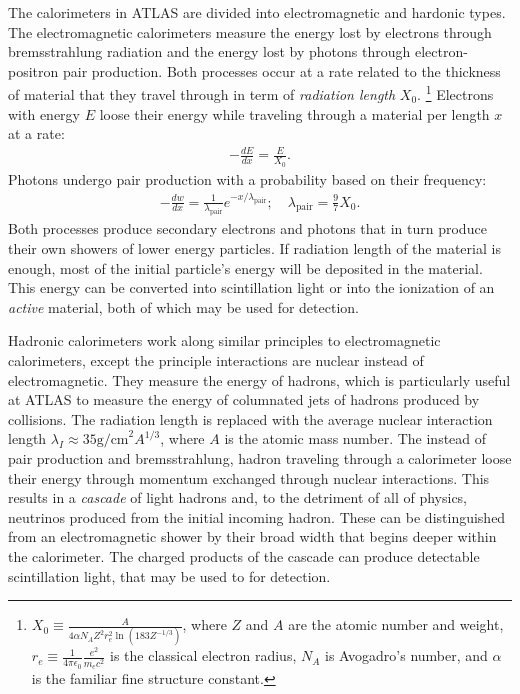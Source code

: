 The calorimeters in ATLAS are divided into electromagnetic and hardonic types.
The electromagnetic calorimeters measure the energy lost by electrons through bremsstrahlung radiation and the energy lost by photons through electron-positron pair production.
Both processes occur at a rate related to the thickness of material that they travel through in term of \emph{radiation length} $X_0$.
\footnote{$X_0\equiv\frac{A}{4\alpha N_AZ^2r_e^2\ln(183Z^{-1/3})}$, where $Z$ and $A$ are the atomic number and weight, $r_e\equiv\frac{1}{4\pi\epsilon_0}\frac{e^2}{m_ec^2}$ is the classical electron radius, $N_A$ is Avogadro's number, and $\alpha$ is the familiar fine structure constant.}
Electrons with energy $E$ loose their energy while traveling through a material per length $x$ at a rate:
\begin{equation}\begin{split}
    -\frac{dE}{dx}=\frac{E}{X_0}.
\end{split}\end{equation} 
Photons undergo pair production with a probability based on their frequency:
\begin{equation}\begin{split}
    -\frac{dw}{dx}=\frac{1}{\lambda_\text{pair}}e^{-x/\lambda_\text{pair}}; \quad \lambda_\text{pair}=\frac{9}{7}X_0.
\end{split}\end{equation} 
Both processes produce secondary electrons and photons that in turn produce their own showers of lower energy particles.
If radiation length of the material is enough, most of the initial particle's energy will be deposited in the material.
This energy can be converted into scintillation light or into the ionization of an \emph{active} material, both of which may be used for detection.
\cite{grupen}

Hadronic calorimeters work along similar principles to electromagnetic calorimeters, except the principle interactions are nuclear instead of electromagnetic.
They measure the energy of hadrons, which is particularly useful at ATLAS to measure the energy of columnated jets of hadrons produced by collisions.
The radiation length is replaced with the average nuclear interaction length $\lambda_I\approx35\text{g/cm}^2A^{1/3}$, where $A$ is the atomic mass number.
The instead of pair production and bremsstrahlung, hadron traveling through a calorimeter loose their energy through momentum exchanged through nuclear interactions.
This results in a \emph{cascade} of light hadrons and, to the detriment of all of physics, neutrinos produced from the initial incoming hadron.
These can be distinguished from an electromagnetic shower by their broad width that begins deeper within the calorimeter.
The charged products of the cascade can produce detectable scintillation light, that may be used to for detection.
\cite{grupen}


